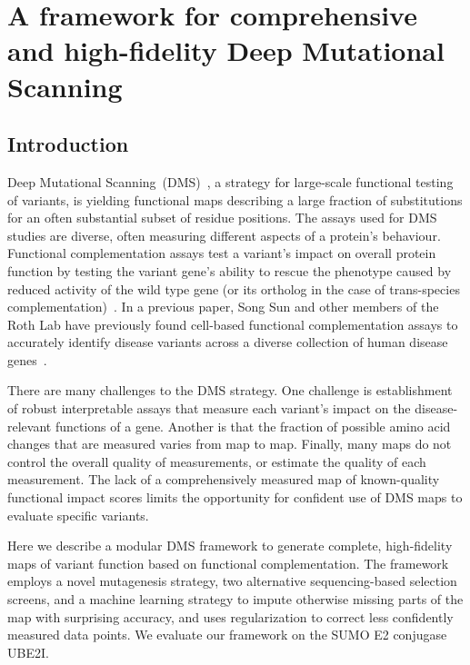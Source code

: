 

\chapter[A comprehensive high-fidelity DMS framework]{A framework for comprehensive and high-fidelity Deep Mutational Scanning}
\label{ch:data1}

\section{Introduction}


Deep Mutational Scanning~(DMS)~\cite{fowler_high-resolution_2010}, a strategy for large-scale functional testing of variants, is yielding functional maps describing a large fraction of substitutions for an often substantial subset of residue positions. The assays used for DMS studies are diverse, often measuring different aspects of a protein's behaviour. Functional complementation assays test a variant's impact on overall protein function by testing the variant gene's ability to rescue the phenotype caused by reduced activity of the wild type gene (or its ortholog in the case of trans-species complementation)~\cite{lee_complementation_1987,osborn_rescuing_2007}. In a previous paper, Song Sun and other members of the Roth Lab have previously found cell-based functional complementation assays to accurately identify disease variants across a diverse collection of human disease genes~\cite{sun_extended_2016}. 

There are many challenges to the DMS strategy.  One challenge is establishment of robust interpretable assays that measure each variant's impact on the disease-relevant functions of a gene. Another is that the fraction of possible amino acid changes that are measured varies from map to map. Finally, many maps do not control the overall quality of measurements, or estimate the quality of each measurement. The lack of a comprehensively measured map of known-quality functional impact scores limits the opportunity for confident use of DMS maps to evaluate specific variants.

Here we describe a modular DMS framework to generate  complete, high-fidelity maps of variant function based on functional complementation. The framework employs a novel mutagenesis strategy, two alternative sequencing-based selection screens, and a machine learning strategy to impute  otherwise missing parts of the map with surprising accuracy, and uses regularization to correct less confidently measured data points. We evaluate our framework on the SUMO E2 conjugase UBE2I.


